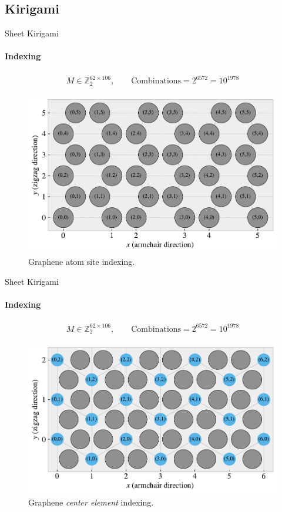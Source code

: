 \documentclass[
	10pt, %
]{beamer}
\begin{document}
\subsection{Kirigami}
\begin{frame}{Sheet Kirigami}
	\framesubtitle{Indexing}
	\begin{align*}
		M \in \mathbb{Z}_2^{62 \times 106}, \qquad \text{Combinations} = 2^{6572} = 10^{1978}
	\end{align*}
	\begin{figure}[H]
		\centering
		\includegraphics[width=0.7\linewidth]{../thesis/figures/system/atom_indexing.pdf}
		\caption{Graphene atom site indexing.}
	\end{figure}	
\end{frame}
%
%
\begin{frame}{Sheet Kirigami}
	\framesubtitle{Indexing}
	\begin{align*}
		M \in \mathbb{Z}_2^{62 \times 106}, \qquad \text{Combinations} = 2^{6572} = 10^{1978}
	\end{align*}
	\begin{figure}[H]
		\centering
		\includegraphics[width=0.7\linewidth]{../thesis/figures/system/center_indexing.pdf}
		\caption{Graphene \textit{center element} indexing.}
	\end{figure}	
\end{frame}
\end{document}
